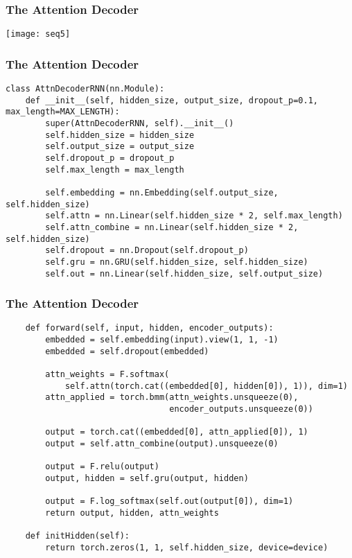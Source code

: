 \begin{frame}[fragile]
\frametitle{The Attention Decoder}
\begin{center}
\texttt{[image: seq5]}
\end{center}           
\end{frame} 

\begin{frame}[fragile]
\frametitle{The Attention Decoder}
\begin{lstlisting}    
class AttnDecoderRNN(nn.Module):
    def __init__(self, hidden_size, output_size, dropout_p=0.1, max_length=MAX_LENGTH):
        super(AttnDecoderRNN, self).__init__()
        self.hidden_size = hidden_size
        self.output_size = output_size
        self.dropout_p = dropout_p
        self.max_length = max_length

        self.embedding = nn.Embedding(self.output_size, self.hidden_size)
        self.attn = nn.Linear(self.hidden_size * 2, self.max_length)
        self.attn_combine = nn.Linear(self.hidden_size * 2, self.hidden_size)
        self.dropout = nn.Dropout(self.dropout_p)
        self.gru = nn.GRU(self.hidden_size, self.hidden_size)
        self.out = nn.Linear(self.hidden_size, self.output_size)
 \end{lstlisting} 
      
\end{frame} 
\begin{frame}[fragile]
\frametitle{The Attention Decoder}
\begin{lstlisting}    
    def forward(self, input, hidden, encoder_outputs):
        embedded = self.embedding(input).view(1, 1, -1)
        embedded = self.dropout(embedded)

        attn_weights = F.softmax(
            self.attn(torch.cat((embedded[0], hidden[0]), 1)), dim=1)
        attn_applied = torch.bmm(attn_weights.unsqueeze(0),
                                 encoder_outputs.unsqueeze(0))

        output = torch.cat((embedded[0], attn_applied[0]), 1)
        output = self.attn_combine(output).unsqueeze(0)

        output = F.relu(output)
        output, hidden = self.gru(output, hidden)

        output = F.log_softmax(self.out(output[0]), dim=1)
        return output, hidden, attn_weights

    def initHidden(self):
        return torch.zeros(1, 1, self.hidden_size, device=device)
 \end{lstlisting} 
      
\end{frame} 

